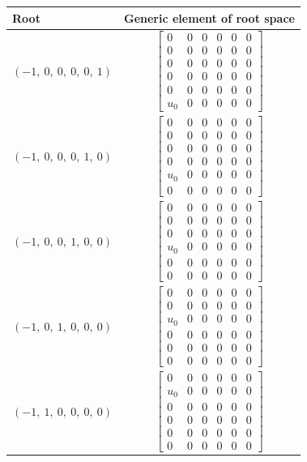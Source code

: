 \documentclass[11pt]{article}
\theoremstyle{definition}
\begin{document}
\noindent \begin{longtable}{|l|c|}
    \hline
    \textbf{Root} & \textbf{Generic element of root space} \\
    \hline
    \endhead
    $\left( -1, \  0, \  0, \  0, \  0, \  1\right)$ & ${\left[\begin{matrix}0 & 0 & 0 & 0 & 0 & 0\\0 & 0 & 0 & 0 & 0 & 0\\0 & 0 & 0 & 0 & 0 & 0\\0 & 0 & 0 & 0 & 0 & 0\\0 & 0 & 0 & 0 & 0 & 0\\u_{0} & 0 & 0 & 0 & 0 & 0\end{matrix}\right]}$ \\
    \hline
    $\left( -1, \  0, \  0, \  0, \  1, \  0\right)$ & ${\left[\begin{matrix}0 & 0 & 0 & 0 & 0 & 0\\0 & 0 & 0 & 0 & 0 & 0\\0 & 0 & 0 & 0 & 0 & 0\\0 & 0 & 0 & 0 & 0 & 0\\u_{0} & 0 & 0 & 0 & 0 & 0\\0 & 0 & 0 & 0 & 0 & 0\end{matrix}\right]}$ \\
    \hline
    $\left( -1, \  0, \  0, \  1, \  0, \  0\right)$ & ${\left[\begin{matrix}0 & 0 & 0 & 0 & 0 & 0\\0 & 0 & 0 & 0 & 0 & 0\\0 & 0 & 0 & 0 & 0 & 0\\u_{0} & 0 & 0 & 0 & 0 & 0\\0 & 0 & 0 & 0 & 0 & 0\\0 & 0 & 0 & 0 & 0 & 0\end{matrix}\right]}$ \\
    \hline
    $\left( -1, \  0, \  1, \  0, \  0, \  0\right)$ & ${\left[\begin{matrix}0 & 0 & 0 & 0 & 0 & 0\\0 & 0 & 0 & 0 & 0 & 0\\u_{0} & 0 & 0 & 0 & 0 & 0\\0 & 0 & 0 & 0 & 0 & 0\\0 & 0 & 0 & 0 & 0 & 0\\0 & 0 & 0 & 0 & 0 & 0\end{matrix}\right]}$ \\
    \hline
    $\left( -1, \  1, \  0, \  0, \  0, \  0\right)$ & ${\left[\begin{matrix}0 & 0 & 0 & 0 & 0 & 0\\u_{0} & 0 & 0 & 0 & 0 & 0\\0 & 0 & 0 & 0 & 0 & 0\\0 & 0 & 0 & 0 & 0 & 0\\0 & 0 & 0 & 0 & 0 & 0\\0 & 0 & 0 & 0 & 0 & 0\end{matrix}\right]}$ \\

\end{longtable}
\end{document}
